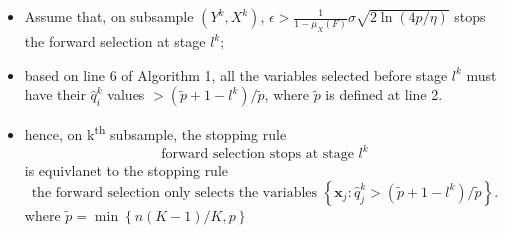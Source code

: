 \documentclass[11pt,review,authoryear]{elsarticle}
\begin{document}
\begin{appendices}
\begin{itemize}
  \item Assume that, on subsample $\left(Y^{k},X^{k}\right)$, $\epsilon>\frac{1}{1-\mu_{X}\left(F\right)}\sigma\sqrt{2\ln\left(4p/\eta\right)}$ stops the forward selection at stage $l^{k}$;
  \item based on line 6 of Algorithm 1, all the variables selected before stage $l^{k}$ must have their $\widehat{q}_{i}^{k}$ values $>\left(\widetilde{p}+1-l^{k}\right)/\widetilde{p}$, where $\widetilde{p}$ is defined at line 2.
  \item hence, on k\textsuperscript{th} subsample, the stopping rule 
  \begin{displaymath}
    \mbox{forward selection stops at stage } l^k
  \end{displaymath}
  is equivlanet to the stopping rule
  \begin{displaymath}
    \mbox{the forward selection only selects the variables } \left\{ \mathbf{x}_j:\widehat{q}_j^k>\left(\widetilde{p}+1-l^k\right)/\widetilde{p}\right\}.
  \end{displaymath}
  where $\widetilde{p} = \min\left\{ n(K-1)/K, p\right\}$
\end{itemize}
\medskip


\end{appendices}
\end{document}
